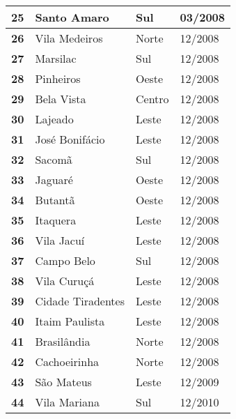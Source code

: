 \begin{table}[H]
\begin{tabular}{l|l|l|l}
\textbf{25} & Santo Amaro & Sul & 03/2008\\ \hline
\textbf{26} & Vila Medeiros & Norte & 12/2008\\ \hline
\textbf{27} & Marsilac & Sul & 12/2008\\ \hline
\textbf{28} & Pinheiros & Oeste & 12/2008\\ \hline
\textbf{29} & Bela Vista & Centro & 12/2008\\ \hline
\textbf{30} & Lajeado & Leste & 12/2008\\ \hline
\textbf{31} & José Bonifácio & Leste & 12/2008\\ \hline
\textbf{32} & Sacomã & Sul & 12/2008\\ \hline
\textbf{33} & Jaguaré & Oeste & 12/2008\\ \hline
\textbf{34} & Butantã & Oeste & 12/2008\\ \hline
\textbf{35} & Itaquera & Leste & 12/2008\\ \hline
\textbf{36} & Vila Jacuí & Leste & 12/2008\\ \hline
\textbf{37} & Campo Belo & Sul & 12/2008\\ \hline
\textbf{38} & Vila Curuçá & Leste & 12/2008\\ \hline
\textbf{39} & Cidade Tiradentes & Leste & 12/2008\\ \hline
\textbf{40} & Itaim Paulista & Leste & 12/2008\\ \hline
\textbf{41} & Brasilândia & Norte & 12/2008\\ \hline
\textbf{42} & Cachoeirinha & Norte & 12/2008\\ \hline
\textbf{43} & São Mateus & Leste & 12/2009\\ \hline
\textbf{44} & Vila Mariana & Sul & 12/2010\\ 
\end{tabular}
\end{table}


